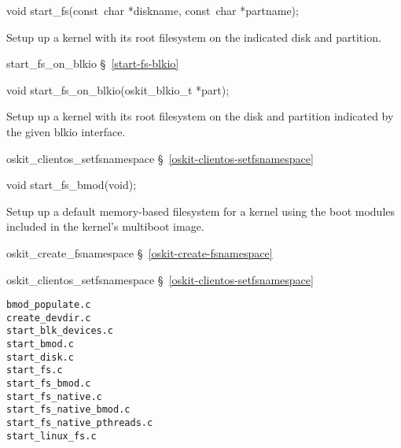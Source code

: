 
\label{start-fs}
\begin{apisyn}

	\funcproto void start_fs(const~char *diskname, const~char *partname);
\end{apisyn}
\begin{apidesc}
	Setup up a kernel with its root filesystem on the indicated disk
	and partition.
\end{apidesc}
\begin{apidep}
	\item[start_fs_on_blkio]	\S~\ref{start-fs-blkio}
\end{apidep}

\label{start-fs-blkio}
\begin{apisyn}

	\funcproto void start_fs_on_blkio(oskit_blkio_t *part);
\end{apisyn}
\begin{apidesc}
	Setup up a kernel with its root filesystem on the disk and
	partition indicated by the given blkio interface.
\end{apidesc}
\begin{apidep}
	\item[oskit_clientos_setfsnamespace]	\S~\ref{oskit-clientos-setfsnamespace}
\end{apidep}

\label{start-fs-bmod}
\begin{apisyn}

	\funcproto void start_fs_bmod(void);
\end{apisyn}
\begin{apidesc}
	Setup up a default memory-based filesystem for a kernel using the
	boot modules included in the kernel's multiboot image.
\end{apidesc}
\begin{apidep}
	\item[oskit_create_fsnamespace]	\S~\ref{oskit-create-fsnamespace}
	\item[oskit_clientos_setfsnamespace]	\S~\ref{oskit-clientos-setfsnamespace}
\end{apidep}

\begin{verbatim}
bmod_populate.c
create_devdir.c
start_blk_devices.c
start_bmod.c
start_disk.c
start_fs.c
start_fs_bmod.c
start_fs_native.c
start_fs_native_bmod.c
start_fs_native_pthreads.c
start_linux_fs.c
\end{verbatim}

